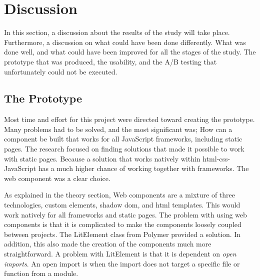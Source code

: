\section{Discussion}

In this section, a discussion about the results of the study will take place. Furthermore, a discussion on what could have been done differently. What was done well, and what could have been improved for all the stages of the study. The prototype that was produced, the usability, and the A/B testing that unfortunately could not be executed. 


\subsection{The Prototype}%
\label{sub:The Prototype}

Most time and effort for this project were directed toward creating the prototype. Many problems had to be solved, and the most significant was; How can a component be built that works for all JavaScript frameworks, including static pages. The research focused on finding solutions that made it possible to work with static pages. Because a solution that works natively within \acrshort{html}-\acrshort{css}-JavaScript has a much higher chance of working together with frameworks. The web component was a clear choice. 


As explained in the theory section, Web components are a mixture of three technologies, custom elements, shadow \acrshort{dom}, and \acrshort{html} templates. This would work natively for all frameworks and static pages. The problem with using web components is that it is complicated to make the components loosely coupled between projects. The LitElement class from Polymer provided a solution. In addition, this also made the creation of the components much more straightforward. A problem with LitElement is that it is dependent on \textit{open imports}. An open import is when the import does not target a specific file or function from a module.


